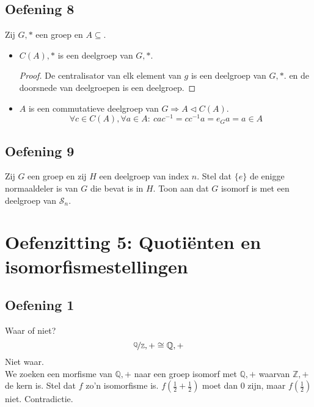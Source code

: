 \documentclass[main.tex]{subfiles}
\begin{document}
\subsection*{Oefening 8}
\label{sec:oz4-oef8}
Zij $G,*$ een groep en $A\subseteq$.
\begin{itemize}
\item $C(A),*$ is een deelgroep van $G,*$.
  \begin{proof}
    De centralisator van elk element van $g$ is een deelgroep van $G,*$. en de doorsnede van deelgroepen is een deelgroep.
  \end{proof}
\item $A$ is een commutatieve deelgroep van $G \Rightarrow A \triangleleft C(A)$.
  \[ \forall c\in C(A), \forall a\in A:\ cac^{-1} = cc^{-1}a = e_{G}a = a \in A \]
\end{itemize}

\subsection*{Oefening 9}
\label{sec:oz4-oef9}
Zij $G$ een groep en zij $H$ een deelgroep van index $n$.
Stel dat $\{e\}$ de enigge normaaldeler is van $G$ die bevat is in $H$.
Toon aan dat $G$ isomorf is met een deelgroep van $\mathcal{S}_{n}$.

\section{Oefenzitting 5: Quoti\"enten en isomorfismestellingen}

\subsection*{Oefening 1}
\label{sec:oz5-oef1}
Waar of niet?
\[ \nicefrac{\mathbb{Q}}{\mathbb{Z}},+ \cong \mathbb{Q},+ \]
Niet waar.\\
We zoeken een morfisme van $\mathbb{Q},+$ naar een groep isomorf met $\mathbb{Q},+$ waarvan $\mathbb{Z},+$ de kern is.
Stel dat $f$ zo'n isomorfisme is.
$f(\frac{1}{2} + \frac{1}{2})$ moet dan $0$ zijn, maar $f(\frac{1}{2})$ niet. Contradictie.
\end{document}
